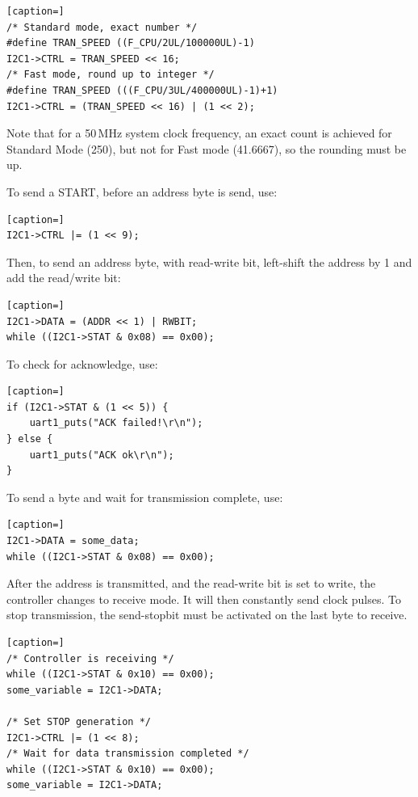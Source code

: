 \documentclass[12pt]{article}
\begin{document}
\begin{lstlisting}[caption=]
/* Standard mode, exact number */
#define TRAN_SPEED ((F_CPU/2UL/100000UL)-1)
I2C1->CTRL = TRAN_SPEED << 16;
/* Fast mode, round up to integer */
#define TRAN_SPEED (((F_CPU/3UL/400000UL)-1)+1)
I2C1->CTRL = (TRAN_SPEED << 16) | (1 << 2);
\end{lstlisting} 

Note that for a 50\,MHz system clock frequency, an exact count is achieved for Standard Mode (250), but not for Fast mode (41.6667), so the rounding must be up.

To send a START, before an address byte is send, use:

\begin{lstlisting}[caption=]
I2C1->CTRL |= (1 << 9);
\end{lstlisting} 

Then, to send an address byte, with read-write bit, left-shift the address by 1 and add the read/write bit:

\begin{lstlisting}[caption=]
I2C1->DATA = (ADDR << 1) | RWBIT;
while ((I2C1->STAT & 0x08) == 0x00);
\end{lstlisting} 

To check for acknowledge, use:

\begin{lstlisting}[caption=]
if (I2C1->STAT & (1 << 5)) {
    uart1_puts("ACK failed!\r\n");
} else {
    uart1_puts("ACK ok\r\n");
}
\end{lstlisting} 

To send a byte and wait for transmission complete, use:

\begin{lstlisting}[caption=]
I2C1->DATA = some_data;
while ((I2C1->STAT & 0x08) == 0x00);
\end{lstlisting} 

After the address is transmitted, and the read-write bit is set to write, the controller changes to receive mode. It will then constantly send clock pulses. To stop transmission, the send-stopbit must be activated on the last byte to receive.

\begin{lstlisting}[caption=]
/* Controller is receiving */
while ((I2C1->STAT & 0x10) == 0x00);
some_variable = I2C1->DATA;

/* Set STOP generation */
I2C1->CTRL |= (1 << 8);
/* Wait for data transmission completed */
while ((I2C1->STAT & 0x10) == 0x00);
some_variable = I2C1->DATA;
\end{lstlisting} 
\end{document}
